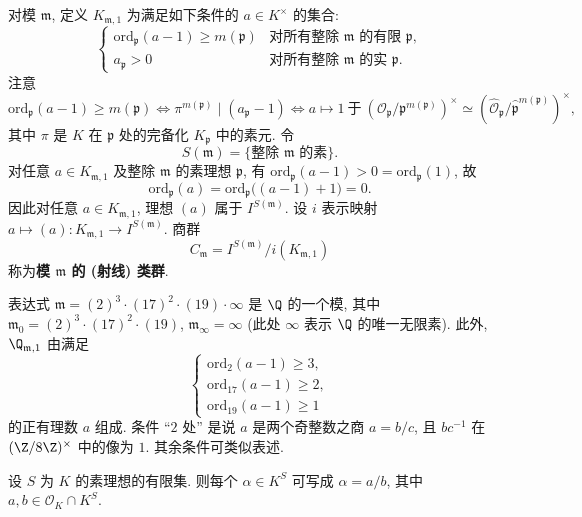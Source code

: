 对模 $\mathfrak{m}$, 定义 $K_{\mathfrak{m},1}$ 为满足如下条件的 $a\in K^{\times}$ 的集合:
\[
\begin{cases}
\mathrm{ord}_{\mathfrak{p}}(a-1)\ge m(\mathfrak{p}) & \text{对所有整除 }\mathfrak{m}\text{ 的有限 }\mathfrak{p},\\[2pt]
a_{\mathfrak{p}}>0 & \text{对所有整除 }\mathfrak{m}\text{ 的实 }\mathfrak{p}.
\end{cases}
\]
注意
\[
\mathrm{ord}_{\mathfrak{p}}(a-1)\ge m(\mathfrak{p})
\iff \pi^{m(\mathfrak{p})}\mid(a_{\mathfrak{p}}-1)
\iff a\mapsto 1\ \text{于}\ (\mathcal{O}_{\mathfrak{p}}/\mathfrak{p}^{m(\mathfrak{p})})^{\times}\simeq(\hat{\mathcal{O}}_{\mathfrak{p}}/\hat{\mathfrak{p}}^{m(\mathfrak{p})})^{\times},
\]
其中 $\pi$ 是 $K$ 在 $\mathfrak{p}$ 处的完备化 $K_{\mathfrak{p}}$ 中的素元. 令
\[
S(\mathfrak{m})=\{\text{整除 }\mathfrak{m}\text{ 的素}\}.
\]
对任意 $a\in K_{\mathfrak{m},1}$ 及整除 $\mathfrak{m}$ 的素理想 $\mathfrak{p}$, 有 $\mathrm{ord}_{\mathfrak{p}}(a-1)>0=\mathrm{ord}_{\mathfrak{p}}(1)$, 故
\[
\mathrm{ord}_{\mathfrak{p}}(a)=\mathrm{ord}_{\mathfrak{p}}\bigl((a-1)+1\bigr)=0.
\]
因此对任意 $a\in K_{\mathfrak{m},1}$, 理想 $(a)$ 属于 $I^{S(\mathfrak{m})}$. 设 $i$ 表示映射 $a\mapsto(a)\colon K_{\mathfrak{m},1}\to I^{S(\mathfrak{m})}$. 商群
\[
C_{\mathfrak{m}}=I^{S(\mathfrak{m})}/i(K_{\mathfrak{m},1})
\]
称为\textbf{模 $\mathfrak{m}$ 的 (射线) 类群}.

\begin{example}\label{ex:v.1.4}
表达式 $\mathfrak{m}=(2)^3\cdot(17)^2\cdot(19)\cdot\infty$ 是 $\Q$ 的一个模, 其中 $\mathfrak{m}_0=(2)^3\cdot(17)^2\cdot(19)$, $\mathfrak{m}_\infty=\infty$ (此处 $\infty$ 表示 $\Q$ 的唯一无限素). 此外, $\Q_{\mathfrak{m},1}$ 由满足
\[
\begin{cases}
\mathrm{ord}_2(a-1)\ge 3,\\
\mathrm{ord}_{17}(a-1)\ge 2,\\
\mathrm{ord}_{19}(a-1)\ge 1
\end{cases}
\]
的正有理数 $a$ 组成. 条件 ``$2$ 处'' 是说 $a$ 是两个奇整数之商 $a=b/c$, 且 $bc^{-1}$ 在 $(\Z/8\Z)^{\times}$ 中的像为 $1$. 其余条件可类似表述.
\end{example}

\begin{lemma}\label{lem:v.1.5}
设 $S$ 为 $K$ 的素理想的有限集. 则每个 $\alpha\in K^S$ 可写成 $\alpha=a/b$, 其中 $a,b\in\mathcal{O}_K\cap K^S$.
\end{lemma}

